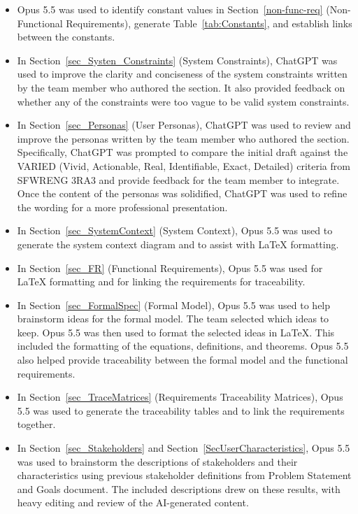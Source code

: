 \documentclass[10pt]{article}
\begin{document}
\begin{itemize}
    \item Opus 5.5 was used to identify constant values in Section~\ref{non-func-req} (Non-Functional Requirements),
    generate Table~\ref{tab:Constants}, and establish links between the constants.

    \item In Section~\ref{sec_Systen_Constraints} (System Constraints), ChatGPT was used to improve
    the clarity and conciseness of the system constraints written by the
    team member who authored the section. It also provided feedback on
    whether any of the constraints were too vague to be valid system constraints.

    \item In Section~\ref{sec_Personas} (User Personas), ChatGPT was used to review and
    improve the personas written by the team member who authored the section.
    Specifically, ChatGPT was prompted to compare the initial draft against
    the VARIED (Vivid, Actionable, Real, Identifiable, Exact, Detailed) criteria
    from SFWRENG 3RA3 and provide feedback for the team member to integrate.
    Once the content of the personas was solidified, ChatGPT was used to
    refine the wording for a more professional presentation.

    \item In Section~\ref{sec_SystemContext} (System Context), Opus 5.5 was
    used to generate the system context diagram and to assist with \LaTeX{}
    formatting.

    \item In Section~\ref{sec_FR} (Functional Requirements), Opus 5.5 was used
    for \LaTeX{} formatting and for linking the requirements for traceability.

    \item In Section~\ref{sec_FormalSpec} (Formal Model), Opus 5.5 was used to
    help brainstorm ideas for the formal model. The team selected which ideas
    to keep. Opus 5.5 was then used to format the selected ideas in \LaTeX{}.
    This included the formatting of the equations, definitions, and theorems.
    Opus 5.5 also helped provide traceability between the formal model and
    the functional requirements.

    \item In Section~\ref{sec_TraceMatrices} (Requirements Traceability
    Matrices), Opus 5.5 was used to generate the traceability tables and to
    link the requirements together.

    \item In Section~\ref{sec_Stakeholders} and Section~\ref{SecUserCharacteristics}, Opus 
    5.5 was used to brainstorm the descriptions of stakeholders and their characteristics 
    using previous stakeholder definitions from Problem Statement and Goals document. The included descriptions drew on these results, with heavy editing and review
    of the AI-generated content.


\end{itemize}
\end{document}
